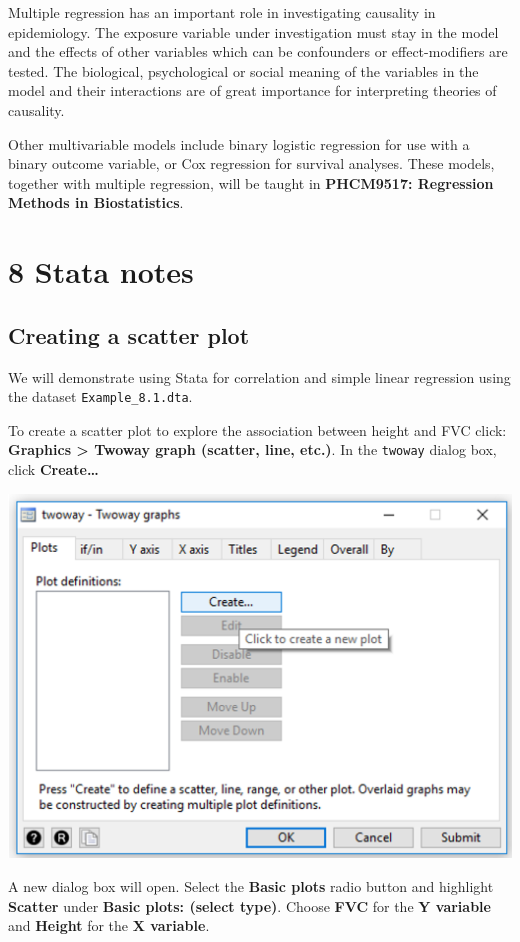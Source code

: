 \documentclass[
]{memoir}
\begin{document}
Multiple regression has an important role in investigating causality in epidemiology. The exposure variable under investigation must stay in the model and the effects of other variables which can be confounders or effect-modifiers are tested. The biological, psychological or social meaning of the variables in the model and their interactions are of great importance for interpreting theories of causality.

Other multivariable models include binary logistic regression for use with a binary outcome variable, or Cox regression for survival analyses. These models, together with multiple regression, will be taught in \textbf{PHCM9517: Regression Methods in Biostatistics}.

\hypertarget{stata-notes}{%
\chapter*{\texorpdfstring{\textbf{8} Stata notes}{8 Stata notes}}\label{stata-notes}}

\hypertarget{creating-a-scatter-plot}{%
\section{Creating a scatter plot}\label{creating-a-scatter-plot}}

We will demonstrate using Stata for correlation and simple linear regression using the dataset \texttt{Example\_8.1.dta}.

To create a scatter plot to explore the association between height and FVC click: \textbf{Graphics \textgreater{} Twoway graph (scatter, line, etc.)}. In the \texttt{twoway} dialog box, click \textbf{Create\ldots{}}

\includegraphics[width=0.66\linewidth]{img/mod08/stata/twoway-1}

A new dialog box will open. Select the \textbf{Basic plots} radio button and highlight \textbf{Scatter} under \textbf{Basic plots: (select type)}. Choose \textbf{FVC} for the \textbf{Y variable} and \textbf{Height} for the \textbf{X variable}.
\end{document}
